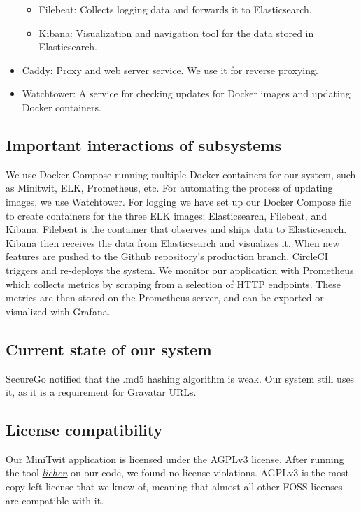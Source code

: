 \begin{itemize}
\begin{itemize}
        \item Filebeat: Collects logging data and forwards it to Elasticsearch.
        \vspace{0.5em}
        \item Kibana: Visualization and navigation tool for the data stored in Elasticsearch. 
        \vspace{0.5em}
    \end{itemize}
    \item Caddy: Proxy and web server service. We use it for reverse proxying.
    \vspace{0.5em}
    \item Watchtower: A service for checking updates for Docker images and updating Docker containers.
\end{itemize}

\subsection{Important interactions of subsystems}
We use Docker Compose running multiple Docker containers for our system, such as Minitwit, ELK, Prometheus, etc. For automating the process of updating images, we use Watchtower.
\vspace{0.5em} \newline 
For logging we have set up our Docker Compose file to create containers for the three ELK images; Elasticsearch, Filebeat, and Kibana. Filebeat is the container that observes and ships data to Elasticsearch. Kibana then receives the data from Elasticsearch and visualizes it. 
\vspace{0.5em} \newline 
When new features are pushed to the Github repository's production branch, CircleCI triggers and re-deploys the system. 
\vspace{0.5em} \newline 
We monitor our application with Prometheus which collects metrics by scraping from a selection of HTTP endpoints. These metrics are then stored on the Prometheus server, and can be exported or visualized with Grafana.

\subsection{Current state of our system}
SecureGo notified that the .md5 hashing algorithm is weak. Our system still uses it, as it is a requirement for Gravatar URLs.




\subsection{License compatibility}

Our MiniTwit application is licensed under the AGPLv3 license. After running the tool \textit{\href{https://github.com/uw-labs/lichen}{lichen}} on our code, we found no license violations. AGPLv3 is the most copy-left license that we know of, meaning that almost all other FOSS licenses are compatible with it.
